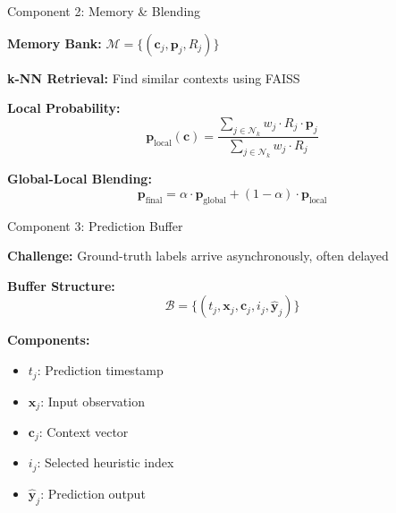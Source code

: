 \documentclass[10pt,xcolor={table,dvipsnames},t]{beamer}
\begin{document}
\begin{frame}{Component 2: Memory \& Blending}

\textbf{Memory Bank:} $\mathcal{M} = \{(\mathbf{c}_j, \mathbf{p}_j, R_j)\}$

\textbf{k-NN Retrieval:} Find similar contexts using FAISS

\vspace{0.3em}
\textbf{Local Probability:}
\begin{equation}
\mathbf{p}_{\text{local}}(\mathbf{c}) = \frac{\sum_{j \in \mathcal{N}_k} w_j \cdot R_j \cdot \mathbf{p}_j}{\sum_{j \in \mathcal{N}_k} w_j \cdot R_j}
\end{equation}

\textbf{Global-Local Blending:}
\begin{equation}
\mathbf{p}_{\text{final}} = \alpha \cdot \mathbf{p}_{\text{global}} + (1-\alpha) \cdot \mathbf{p}_{\text{local}}
\end{equation}

\end{frame}

\begin{frame}{Component 3: Prediction Buffer}

\textbf{Challenge:} Ground-truth labels arrive asynchronously, often delayed

\vspace{0.5em}
\textbf{Buffer Structure:}
\begin{equation}
\mathcal{B} = \{(t_j, \mathbf{x}_j, \mathbf{c}_j, i_j, \hat{\mathbf{y}}_j)\}
\end{equation}

\vspace{0.3em}
\textbf{Components:}
\begin{itemize}
  \item $t_j$: Prediction timestamp
  \item $\mathbf{x}_j$: Input observation
  \item $\mathbf{c}_j$: Context vector
  \item $i_j$: Selected heuristic index
  \item $\hat{\mathbf{y}}_j$: Prediction output
\end{itemize}

\end{frame}
\end{document}
